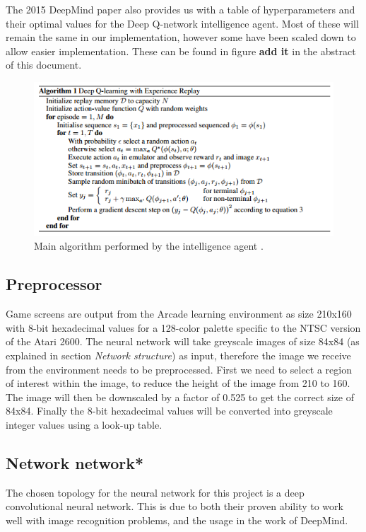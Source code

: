 \documentclass[10pt]{article}
\begin{document}
		The 2015 DeepMind paper also provides us with a table of hyperparameters and their optimal values for the Deep Q-network intelligence agent. Most of these will remain the same in our implementation, however some have been scaled down to allow easier implementation. These can be found in figure \textbf{add it} in the abstract of this document.
		
		\begin{figure}[h]				
			\includegraphics[scale=0.8]{img/agentAlgo}
			\centering
			\caption{Main algorithm performed by the intelligence agent \cite{ataridrl}.}
			\label{fig:agentAlgo}
		\end{figure}
	
	\bigskip
	
	\subsection{Preprocessor}
		Game screens are output from the Arcade learning environment as size 210x160 with 8-bit hexadecimal values for a 128-color palette specific to the NTSC version of the Atari 2600. The neural network will take greyscale images of size 84x84 (as explained in section \textit{Network structure}) as input, therefore the image we receive from the environment needs to be preprocessed. First we need to select a region of interest within the image, to reduce the height of the image from 210 to 160. The image will then be downscaled by a factor of 0.525 to get the correct size of 84x84. Finally the 8-bit hexadecimal values will be converted into greyscale integer values using a look-up table.
	
	\bigskip
	
	\subsection{Network network*}
		The chosen topology for the neural network for this project is a deep convolutional neural network. This is due to both their proven ability to work well with image recognition problems, and the usage in the work of DeepMind.\\
		
\end{document}
